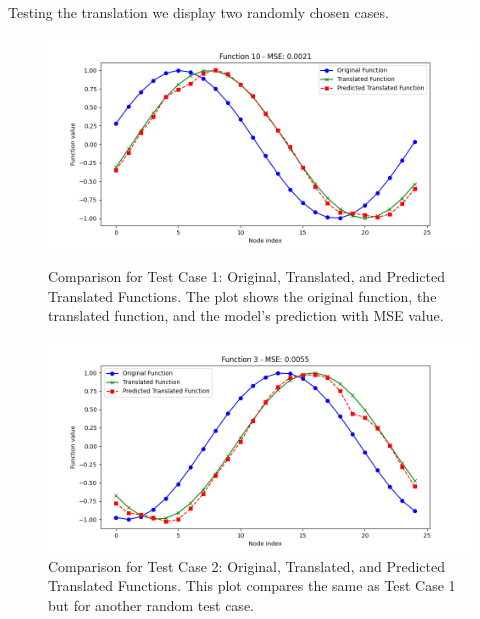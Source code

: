 Testing the translation we display two randomly chosen cases. 

\begin{figure}[h!]
    \centering
    \begin{minipage}{0.45\textwidth}
        \centering
        \includegraphics[width=\textwidth]{images/gnn_test_tds_1.png}
        \caption{Comparison for Test Case 1: Original, Translated, and Predicted Translated Functions. The plot shows the original function, the translated function, and the model's prediction with MSE value.}
        \label{fig:gnn_loss_curve}
    \end{minipage} \hfill
    \begin{minipage}{0.45\textwidth}
        \centering
        \includegraphics[width=\textwidth]{images/gnn_test_tds_2.png}
        \caption{Comparison for Test Case 2: Original, Translated, and Predicted Translated Functions. This plot compares the same as Test Case 1 but for another random test case.}
        \label{fig:gnn_test_1}
    \end{minipage}
\end{figure}



%
